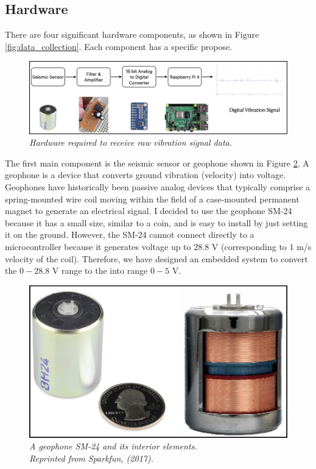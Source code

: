 \subsection{Hardware}

There are four significant hardware components, as shown in Figure \ref{fig:data_collection}. Each component has a specific propose.

\begin{figure}[h]
  \centering
  \caption[Hardware required to receive raw vibration signal data.]{\emph{Hardware required to receive raw vibration signal data. \\}}\label{fig:hardware}
  \includegraphics[scale = 0.2]{figures/hardware.jpg}
\end{figure}


The first main component is the seismic sensor or geophone shown in Figure \ref{fig:seismic}, A geophone is a device that converts ground vibration (velocity) into voltage. Geophones have historically been passive analog devices that typically comprise a spring-mounted wire coil moving within the field of a case-mounted permanent magnet to generate an electrical signal. I decided to use the geophone SM-24 because it has a small size, similar to a coin, and is easy to install by just setting it on the ground. However, the SM-24 cannot connect directly to a microcontroller because it generates voltage up to $28.8$ V (corresponding to $1$ m/s velocity of the coil). Therefore, we have designed an embedded system to convert the $0 - 28.8$ V range to the into range $0 - 5$ V.

\begin{figure}[H]
  \centering
  \caption[A geophone SM-24 and its interior elements.]{\emph{A geophone SM-24 and its interior elements. \\Reprinted from Sparkfun, (2017). }}\label{fig:seismic}
  \includegraphics[scale = 0.3]{figures/seismic.jpg}
\end{figure}


